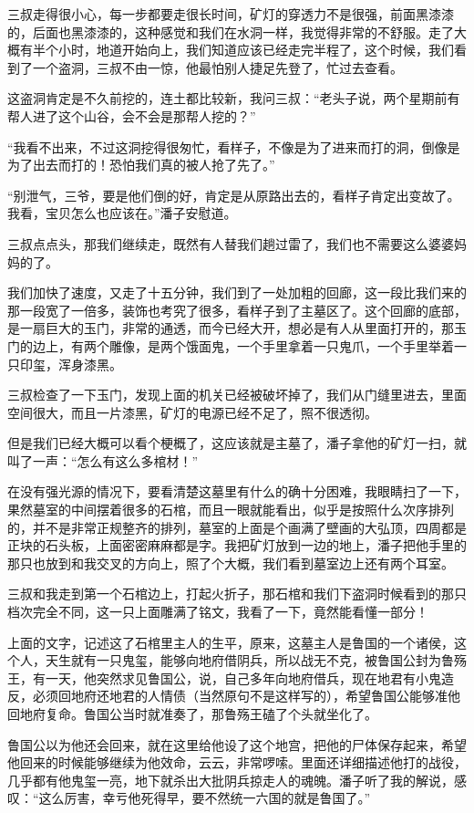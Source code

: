 三叔走得很小心，每一步都要走很长时间，矿灯的穿透力不是很强，前面黑漆漆的，后面也黑漆漆的，这种感觉和我们在水洞一样，我觉得非常的不舒服。走了大概有半个小时，地道开始向上，我们知道应该已经走完半程了，这个时候，我们看到了一个盗洞，三叔不由一惊，他最怕别人捷足先登了，忙过去查看。

这盗洞肯定是不久前挖的，连土都比较新，我问三叔：“老头子说，两个星期前有帮人进了这个山谷，会不会是那帮人挖的？”

“我看不出来，不过这洞挖得很匆忙，看样子，不像是为了进来而打的洞，倒像是为了出去而打的！恐怕我们真的被人抢了先了。”

“别泄气，三爷，要是他们倒的好，肯定是从原路出去的，看样子肯定出变故了。我看，宝贝怎么也应该在。”潘子安慰道。

三叔点点头，那我们继续走，既然有人替我们趟过雷了，我们也不需要这么婆婆妈妈的了。

我们加快了速度，又走了十五分钟，我们到了一处加粗的回廊，这一段比我们来的那一段宽了一倍多，装饰也考究了很多，看样子到了主墓区了。这个回廊的底部，是一扇巨大的玉门，非常的通透，而今已经大开，想必是有人从里面打开的，那玉门的边上，有两个雕像，是两个饿面鬼，一个手里拿着一只鬼爪，一个手里举着一只印玺，浑身漆黑。

三叔检查了一下玉门，发现上面的机关已经被破坏掉了，我们从门缝里进去，里面空间很大，而且一片漆黑，矿灯的电源已经不足了，照不很透彻。

但是我们已经大概可以看个梗概了，这应该就是主墓了，潘子拿他的矿灯一扫，就叫了一声：“怎么有这么多棺材！”

在没有强光源的情况下，要看清楚这墓里有什么的确十分困难，我眼睛扫了一下，果然墓室的中间摆着很多的石棺，而且一眼就能看出，似乎是按照什么次序排列的，并不是非常正规整齐的排列，墓室的上面是个画满了壁画的大弘顶，四周都是正块的石头板，上面密密麻麻都是字。我把矿灯放到一边的地上，潘子把他手里的那只也放到和我交叉的方向上，照了个大概，我们看到墓室边上还有两个耳室。

三叔和我走到第一个石棺边上，打起火折子，那石棺和我们下盗洞时候看到的那只档次完全不同，这一只上面雕满了铭文，我看了一下，竟然能看懂一部分！

上面的文字，记述这了石棺里主人的生平，原来，这墓主人是鲁国的一个诸侯，这个人，天生就有一只鬼玺，能够向地府借阴兵，所以战无不克，被鲁国公封为鲁殇王，有一天，他突然求见鲁国公，说，自己多年向地府借兵，现在地君有小鬼造反，必须回地府还地君的人情债（当然原句不是这样写的），希望鲁国公能够准他回地府复命。鲁国公当时就准奏了，那鲁殇王磕了个头就坐化了。

鲁国公以为他还会回来，就在这里给他设了这个地宫，把他的尸体保存起来，希望他回来的时候能够继续为他效命，云云，非常啰嗦。里面还详细描述他打的战役，几乎都有他鬼玺一亮，地下就杀出大批阴兵掠走人的魂魄。潘子听了我的解说，感叹：“这么厉害，幸亏他死得早，要不然统一六国的就是鲁国了。”

